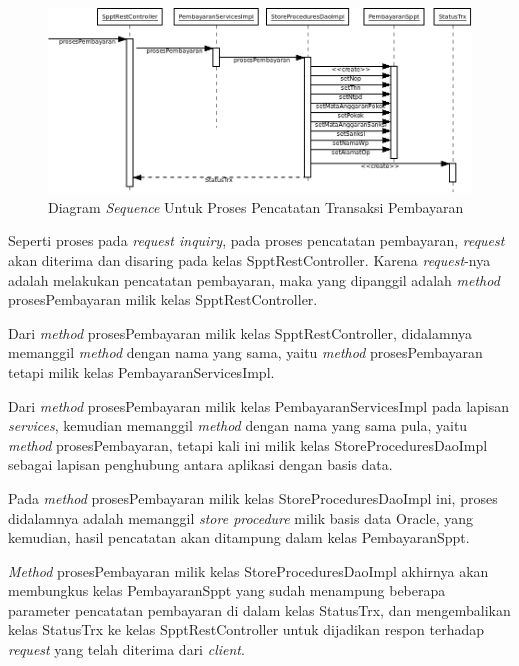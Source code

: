 \begin{enumerate}
  \begin{figure}[H]
    \centering
    \includegraphics[width=1\textwidth]{./resources/uml/uml-seq-trx}
    \caption{Diagram \textit{Sequence} Untuk Proses Pencatatan Transaksi Pembayaran}
    \label{fig:uml-seq-trx}
  \end{figure}
  
  Seperti proses pada \textit{request inquiry}, pada proses pencatatan pembayaran, \textit{request} akan diterima dan disaring pada kelas SpptRestController. Karena \textit{request}-nya adalah melakukan pencatatan pembayaran, maka yang dipanggil adalah \textit{method} prosesPembayaran milik kelas SpptRestController.
  
  Dari \textit{method} prosesPembayaran milik kelas SpptRestController, didalamnya memanggil \textit{method} dengan nama yang sama, yaitu \textit{method} prosesPembayaran tetapi milik kelas PembayaranServicesImpl. 
  
  Dari \textit{method} prosesPembayaran milik kelas PembayaranServicesImpl pada lapisan \textit{services}, kemudian memanggil \textit{method} dengan nama yang sama pula, yaitu \textit{method} prosesPembayaran, tetapi kali ini milik kelas StoreProceduresDaoImpl sebagai lapisan penghubung antara aplikasi dengan basis data.
  
  Pada \textit{method} prosesPembayaran milik kelas StoreProceduresDaoImpl ini, proses didalamnya adalah memanggil \textit{store procedure} milik basis data Oracle, yang kemudian, hasil pencatatan akan ditampung dalam kelas PembayaranSppt.
  
  \textit{Method} prosesPembayaran milik kelas StoreProceduresDaoImpl akhirnya akan membungkus kelas PembayaranSppt yang sudah menampung beberapa parameter pencatatan pembayaran di dalam kelas StatusTrx, dan mengembalikan kelas StatusTrx ke kelas SpptRestController untuk dijadikan respon terhadap \textit{request} yang telah diterima dari \textit{client}.
  

\end{enumerate}
